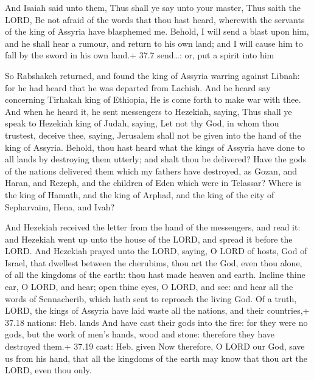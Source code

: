  And Isaiah said unto them, Thus shall ye say unto your
master, Thus saith the LORD, Be not afraid of the words that thou hast
heard, wherewith the servants of the king of Assyria have blasphemed me.
 Behold, I will send a blast upon him, and he shall hear a
rumour, and return to his own land; and I will cause him to fall by the
sword in his own land.+ 37.7 send\ldots: or, put a spirit into him

 So Rabshakeh returned, and found the king of Assyria
warring against Libnah: for he had heard that he was departed from
Lachish.  And he heard say concerning Tirhakah king of
Ethiopia, He is come forth to make war with thee. And when he heard it,
he sent messengers to Hezekiah, saying,  Thus shall ye
speak to Hezekiah king of Judah, saying, Let not thy God, in whom thou
trustest, deceive thee, saying, Jerusalem shall not be given into the
hand of the king of Assyria.  Behold, thou hast heard what
the kings of Assyria have done to all lands by destroying them utterly;
and shalt thou be delivered?  Have the gods of the nations
delivered them which my fathers have destroyed, as Gozan, and Haran, and
Rezeph, and the children of Eden which were in Telassar? 
Where is the king of Hamath, and the king of Arphad, and the king of the
city of Sepharvaim, Hena, and Ivah?

 And Hezekiah received the letter from the hand of the
messengers, and read it: and Hezekiah went up unto the house of the
LORD, and spread it before the LORD.  And Hezekiah prayed
unto the LORD, saying,  O LORD of hosts, God of Israel,
that dwellest between the cherubims, thou art the God, even thou alone,
of all the kingdoms of the earth: thou hast made heaven and earth.
 Incline thine ear, O LORD, and hear; open thine eyes, O
LORD, and see: and hear all the words of Sennacherib, which hath sent to
reproach the living God.  Of a truth, LORD, the kings of
Assyria have laid waste all the nations, and their countries,+ 37.18
nations: Heb. lands  And have cast their gods into the
fire: for they were no gods, but the work of men's hands, wood and
stone: therefore they have destroyed them.+ 37.19 cast: Heb. given
 Now therefore, O LORD our God, save us from his hand, that
all the kingdoms of the earth may know that thou art the LORD, even thou
only.

